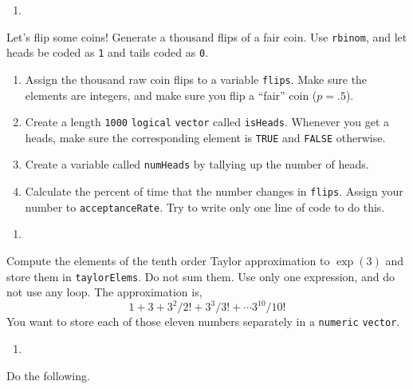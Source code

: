 \documentclass[12pt,krantz2]{krantz}
\providecommand{\tightlist}{%
  \setlength{\itemsep}{0pt}\setlength{\parskip}{0pt}}
\begin{document}
\begin{enumerate}
\def\labelenumi{\arabic{enumi}.}
\item
\end{enumerate}

Let's flip some coins! Generate a thousand flips of a fair coin. Use \texttt{rbinom}, and let heads be coded as \texttt{1} and tails coded as \texttt{0}.

\begin{enumerate}
\def\labelenumi{\alph{enumi})}
\tightlist
\item
  Assign the thousand raw coin flips to a variable \texttt{flips}. Make sure the elements are integers, and make sure you flip a ``fair'' coin (\(p=.5\)).
\item
  Create a length \texttt{1000} \texttt{logical} \texttt{vector} called \texttt{isHeads}. Whenever you get a heads, make sure the corresponding element is \texttt{TRUE} and \texttt{FALSE} otherwise.
\item
  Create a variable called \texttt{numHeads} by tallying up the number of heads.
\item
  Calculate the percent of time that the number changes in \texttt{flips}. Assign your number to \texttt{acceptanceRate}. Try to write only one line of code to do this.
\end{enumerate}

\begin{enumerate}
\def\labelenumi{\arabic{enumi}.}
\setcounter{enumi}{1}
\item
\end{enumerate}

Compute the elements of the tenth order Taylor approximation to \(\exp(3)\) and store them in \texttt{taylorElems}. Do not sum them. Use only one expression, and do not use any loop. The approximation is,\\
\[
1 + 3 + 3^2/2! + 3^3/3! + \cdots 3^{10}/10!
\]
You want to store each of those eleven numbers separately in a \texttt{numeric} \texttt{vector}.

\begin{enumerate}
\def\labelenumi{\arabic{enumi}.}
\setcounter{enumi}{2}
\item
\end{enumerate}

Do the following.
\end{document}

